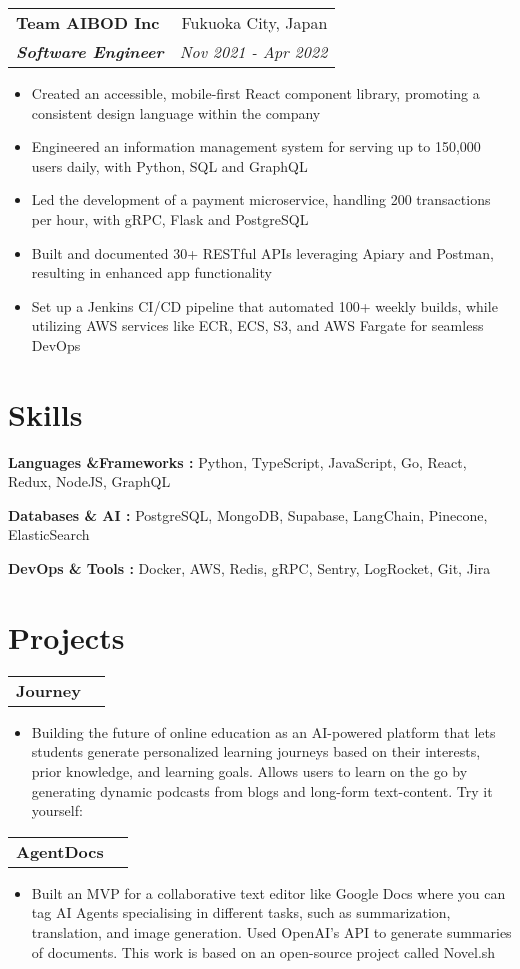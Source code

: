 \documentclass[letterpaper]{article}
\makeatletter
\newcommand{\resumeItemWithoutTitle}[1]{
  \item\small{
    {#1 \vspace{0pt}}
  }
}
\newcommand{\resumeSubheading}[4]{
    \begin{tabular*}{\textwidth}{l@{\extracolsep{\fill}}r}
        \textbf{#1} & #2 \\
        \textbf{\textit{#3}} & \textit{\small #4} \\
    \end{tabular*}\vspace{0pt}
}
\newcommand{\shortSection}[1]{
    \vspace{-6pt}
    \section{#1}
}
\newcommand{\projectHeading}[1]{
  \begin{tabular*}{\textwidth}{l@{\extracolsep{\fill}}r}
        \textbf{#1}
    \end{tabular*}\vspace{0pt}
}
\newcommand*{\skill}[2]{
  \textbf{#1 : }#2 \\
  \vspace{1pt}
}
\newcommand{\resumeItemListStart}{\begin{itemize}}
\newcommand{\resumeItemListEnd}{\end{itemize}}
\makeatother
\begin{document}
\vspace{3pt}
\resumeSubheading
{Team AIBOD Inc}{Fukuoka City, Japan}
{Software Engineer}{Nov 2021 - Apr 2022}
\resumeItemListStart
\resumeItemWithoutTitle{Created an accessible, mobile-first React component library, promoting a consistent design language within the company}
\resumeItemWithoutTitle{Engineered an information management system for serving up to 150,000 users daily,  with Python, SQL and GraphQL}
\resumeItemWithoutTitle{Led the development of a payment microservice, handling 200 transactions per hour, with gRPC, Flask and PostgreSQL}
\resumeItemWithoutTitle{Built and documented 30+ RESTful APIs leveraging Apiary and Postman, resulting in enhanced app functionality}
\resumeItemWithoutTitle{Set up a Jenkins CI/CD pipeline that automated 100+ weekly builds, while utilizing AWS services like ECR, ECS, S3, and AWS Fargate for seamless DevOps}
\resumeItemListEnd



\shortSection{Skills}
\vspace{3pt}
\skill {Languages \&Frameworks}{Python, TypeScript, JavaScript, Go, React, Redux, NodeJS, GraphQL}
\skill {Databases \& AI}{PostgreSQL, MongoDB, Supabase, LangChain, Pinecone, ElasticSearch}
\skill {DevOps \& Tools}{Docker, AWS, Redis, gRPC, Sentry, LogRocket, Git, Jira}


\shortSection{Projects}
\vspace{3pt}
\projectHeading {Journey}
\resumeItemListStart
\resumeItemWithoutTitle{Building the future of online education as an AI-powered platform that lets students generate personalized learning journeys based on their interests, prior knowledge, and learning goals. Allows users to learn on the go by generating dynamic podcasts from blogs and long-form text-content. Try it yourself: \href{https://getjourney.app/home}{\color{blue}{getjourney.app}}}
\resumeItemListEnd


\vspace{3pt}
\projectHeading {AgentDocs}
\resumeItemListStart
\resumeItemWithoutTitle{Built an MVP for a collaborative text editor like Google Docs where you can tag AI Agents specialising in different tasks, such as summarization, translation, and image generation. Used OpenAI's API to generate summaries of documents. This work is based on an open-source project called Novel.sh}
\resumeItemListEnd
\end{document}
